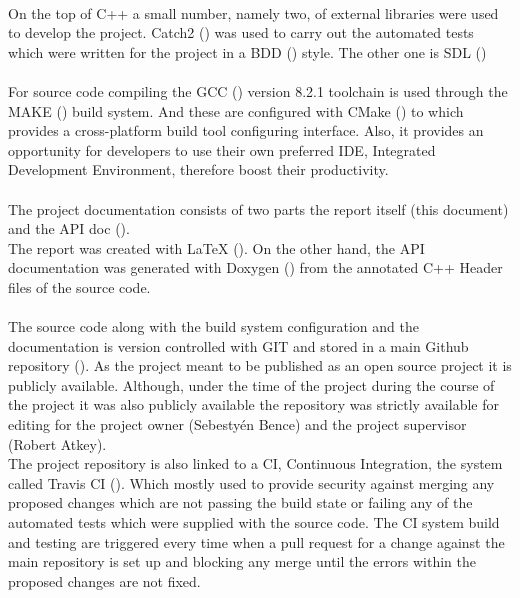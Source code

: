 \documentclass[]{report}
\begin{document}
\paragraph{ }
On the top of C++ a small number, namely two, of external libraries were used to develop the project.
Catch2 (\cite{CTCH}) was used to carry out the automated tests which were written for the project in a BDD (\cite{BDDT}) style.
The other one is SDL (\cite{SDL2})

\paragraph{ }
For source code compiling the GCC (\cite{GCCV}) version 8.2.1 toolchain is used through the MAKE (\cite{MAKE}) build system. And these are configured with CMake (\cite{CMKE}) to which provides a cross-platform build tool configuring interface. Also, it provides an opportunity for developers to use their own preferred IDE, Integrated Development Environment, therefore boost their productivity.

\paragraph{ }
The project documentation consists of two parts the report itself (this document) and the API doc (\cite{APID}).
\\
The report was created with LaTeX (\cite{LATX}). On the other hand, the API documentation was generated with Doxygen (\cite{DOXY}) from the annotated C++ Header files of the source code.

\paragraph{ }
The source code along with the build system configuration and the documentation is version controlled with GIT and stored in a main  Github repository (\cite{REPO}).
As the project meant to be published as an open source project it is publicly available. Although, under the time of the project during the course of the project it was also publicly available the repository was strictly available for editing for the project owner (Sebestyén Bence) and the project supervisor (Robert Atkey).
\\
The project repository is also linked to a CI, Continuous Integration, the system called Travis CI (\cite{TRAV}). Which mostly used to provide security against merging any proposed changes which are not passing the build state or failing any of the automated tests which were supplied with the source code. The CI system build and testing are triggered every time when a pull request for a change against the main repository is set up and blocking any merge until the errors within the proposed changes are not fixed.
\end{document}
